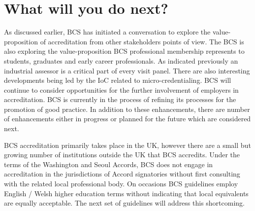 \documentclass[sigconf]{acmart}
\begin{document}
\section {What will you do next?}	
As discussed earlier, BCS has initiated a conversation to explore the
value-proposition of accreditation from other stakeholders points of
view. The BCS is also exploring the value-proposition BCS professional
membership
represents to students, graduates and early career professionals. As
indicated previously an industrial assessor is a critical part of
every visit panel. There are also interesting developments being led
by the IoC related to micro-credentialing. BCS will continue to
consider opportunities for the further involvement of employers in
accreditation. BCS is currently in the process of refining its
processes for the promotion of good practice. In addition to these
enhancements, there are number of enhancements either in progress or
planned for the future which are considered next.

BCS accreditation primarily takes place in the UK, however there are a small but growing number of institutions outside the UK that BCS accredits. Under the terms of the Washington and Seoul Accords, BCS does not engage in accreditation in the jurisdictions of Accord signatories without first consulting with the related local professional body.  On occasions BCS guidelines employ English / Welsh higher education terms without indicating that local equivalents are equally acceptable. The next set of guidelines will address this shortcoming.
\end{document}

